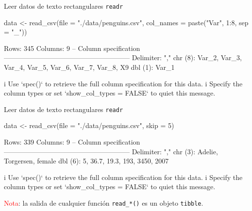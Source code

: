 \documentclass[
  ignorenonframetext,
  aspectratio=169]{beamer}
\newenvironment{Shaded}{\begin{snugshade}}{\end{snugshade}}
\newcommand{\AttributeTok}[1]{\textcolor[rgb]{0.77,0.63,0.00}{#1}}
\newcommand{\DecValTok}[1]{\textcolor[rgb]{0.00,0.00,0.81}{#1}}
\newcommand{\FunctionTok}[1]{\textcolor[rgb]{0.00,0.00,0.00}{#1}}
\newcommand{\NormalTok}[1]{#1}
\newcommand{\OtherTok}[1]{\textcolor[rgb]{0.56,0.35,0.01}{#1}}
\newcommand{\SpecialCharTok}[1]{\textcolor[rgb]{0.00,0.00,0.00}{#1}}
\newcommand{\StringTok}[1]{\textcolor[rgb]{0.31,0.60,0.02}{#1}}
\let\oldverbatim\verbatim
\let\endoldverbatim\endverbatim
\renewenvironment{verbatim}{\tiny\oldverbatim}{\endoldverbatim}
\newcommand\red[1]{\textcolor{red}{#1}}
\begin{document}
\begin{frame}[fragile]{Leer datos de texto rectangulares \texttt{readr}}
\protect\hypertarget{leer-datos-de-texto-rectangulares-readr-3}{}
\begin{Shaded}
\begin{Highlighting}[]
\NormalTok{data }\OtherTok{\textless{}{-}} \FunctionTok{read\_csv}\NormalTok{(}\AttributeTok{file =} \StringTok{"./data/penguins.csv"}\NormalTok{,}
                 \AttributeTok{col\_names =} \FunctionTok{paste}\NormalTok{(}\StringTok{"Var"}\NormalTok{, }\DecValTok{1}\SpecialCharTok{:}\DecValTok{8}\NormalTok{, }\AttributeTok{sep =} \StringTok{"\_"}\NormalTok{))}
\end{Highlighting}
\end{Shaded}

\begin{verbatim}
Rows: 345 Columns: 9
-- Column specification --------------------------------------------------------
Delimiter: ","
chr (8): Var_2, Var_3, Var_4, Var_5, Var_6, Var_7, Var_8, X9
dbl (1): Var_1

i Use `spec()` to retrieve the full column specification for this data.
i Specify the column types or set `show_col_types = FALSE` to quiet this message.
\end{verbatim}
\end{frame}

\begin{frame}[fragile]{Leer datos de texto rectangulares \texttt{readr}}
\protect\hypertarget{leer-datos-de-texto-rectangulares-readr-4}{}
\begin{Shaded}
\begin{Highlighting}[]
\NormalTok{data }\OtherTok{\textless{}{-}} \FunctionTok{read\_csv}\NormalTok{(}\AttributeTok{file =} \StringTok{"./data/penguins.csv"}\NormalTok{, }\AttributeTok{skip =} \DecValTok{5}\NormalTok{)}
\end{Highlighting}
\end{Shaded}

\begin{verbatim}
Rows: 339 Columns: 9
-- Column specification --------------------------------------------------------
Delimiter: ","
chr (3): Adelie, Torgersen, female
dbl (6): 5, 36.7, 19.3, 193, 3450, 2007

i Use `spec()` to retrieve the full column specification for this data.
i Specify the column types or set `show_col_types = FALSE` to quiet this message.
\end{verbatim}

\red{Nota}: la salida de cualquier función \texttt{read\_*()} es un
objeto \texttt{tibble}.
\end{frame}
\end{document}
